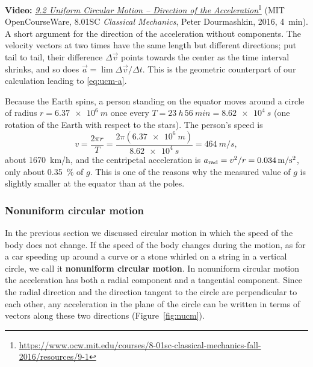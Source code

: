 \documentclass[11pt,a4paper]{article}
\begin{document}
\begin{aside}
\textbf{Video:}
\href{https://www.ocw.mit.edu/courses/8-01sc-classical-mechanics-fall-2016/resources/9-1}{\emph{9.2
Uniform Circular Motion -- Direction of the
Acceleration}}\footnote{\url{https://www.ocw.mit.edu/courses/8-01sc-classical-mechanics-fall-2016/resources/9-1}}
(MIT OpenCourseWare, 8.01SC \emph{Classical Mechanics}, Peter Dourmashkin, 2016, 4~min). A short
argument for the direction of the acceleration without components. The velocity vectors at two
times have the same length but different directions; put tail to tail, their difference
$\Delta\vec{v}$ points towards the center as the time interval shrinks, and so does
$\vec{a} = \lim \Delta\vec{v}/\Delta t$. This is the geometric counterpart of our calculation
leading to \eqref{eq:ucm-a}.
\end{aside}

\begin{example}
Because the Earth spins, a person standing on the equator moves around a circle of radius
$r = \qty{6.37e6}{m}$ once every $T = \qty{23}{h}\,\qty{56}{min} = \qty{8.62e4}{s}$ (one rotation
of the Earth with respect to the stars). The person's speed is
\[
  v = \frac{2\pi r}{T} = \frac{2\pi(\qty{6.37e6}{m})}{\qty{8.62e4}{s}} = \qty{464}{m/s} ,
\]
about \qty{1670}{km/h}, and the centripetal acceleration is $a_{\mathrm{rad}} = v^2/r = \qty{0.034}{m/s^2}$,
only about \qty{0.35}{\percent} of $g$. This is one of the reasons why the measured value of $g$ is
slightly smaller at the equator than at the poles.
\end{example}

\subsubsection{Nonuniform circular motion}\label{sec:nucm}

In the previous section we discussed circular motion in which the speed of the body does not
change. If the speed of the body changes during the motion, as for a car speeding up around a curve
or a stone whirled on a string in a vertical circle, we call it \textbf{nonuniform circular
motion}. In nonuniform circular motion the acceleration has both a radial component and a tangential
component. Since the radial direction and the direction tangent to the circle are perpendicular to
each other, any acceleration in the plane of the circle can be written in terms of vectors along
these two directions (Figure~\ref{fig:nucm}).
\end{document}
